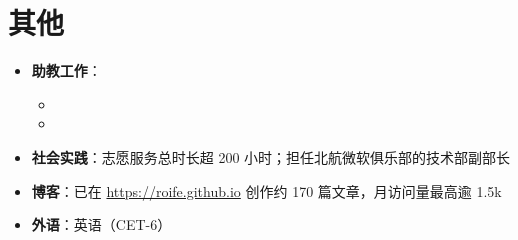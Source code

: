 \documentclass{resume}
\begin{document}
\section{其他}
\begin{itemize}
  \item \textbf{助教工作}：
        \begin{itemize}
          \item {}
          \item {}
        \end{itemize}
  \item \textbf{社会实践}：志愿服务总时长超 200 小时；担任北航微软俱乐部的技术部副部长
  \item \textbf{博客}：已在 \url{https://roife.github.io} 创作约 170 篇文章，月访问量最高逾 1.5k
  \item \textbf{外语}：英语（CET-6）
\end{itemize}
\end{document}
